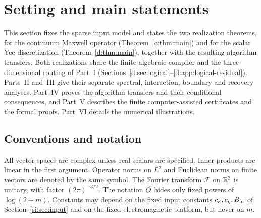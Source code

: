 \section{Setting and main statements}\label{si:sec:setting}

This section fixes the sparse input model and states the two realization
theorems, for the continuum Maxwell operator
(Theorem~\ref{c:thm:main}) and for the scalar Yee discretization
(Theorem~\ref{d:thm:main}), together with the resulting algorithm
transfers. Both realizations share the finite algebraic compiler and the
three-dimensional routing of Part~I
(Sections~\ref{d:sec:logical}--\ref{d:app:logical-residual}). Parts~II
and~III give their separate spectral, interaction, boundary and recovery
analyses. Part~IV proves the algorithm transfers and their conditional
consequences, and Part~V describes the finite computer-assisted
certificates and the formal proofs. Part~VI details the numerical
illustrations.

\subsection{Conventions and notation}\label{si:sec:notation}

All vector spaces are complex unless real scalars are specified. Inner
products are linear in the first argument. Operator norms on $L^2$ and
Euclidean norms on finite vectors are denoted by the same symbol. The
Fourier transform $\mathcal F$ on $\mathbb R^3$ is unitary, with factor $(2\pi)^{-3/2}$.
The notation $\widetilde O$ hides only fixed powers of $\log(2+m)$.
Constants may depend on the fixed input constants $c_\kappa,c_\eta,B_{\rm in}$ of
Section~\ref{si:sec:input} and on the fixed
electromagnetic platform, but never on $m$.

